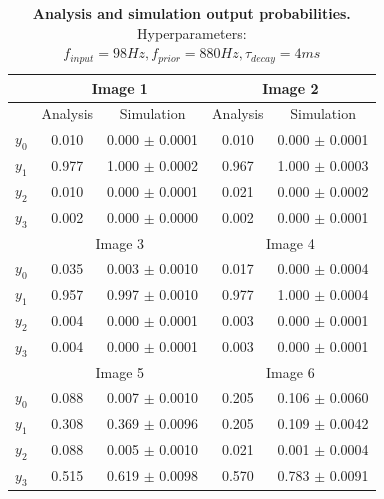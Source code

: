 \begin{table}[]
\centering
\label{tab:doubleSize_98_880_4}
\small
\tabcolsep=0.11cm
\begin{tabular}{|c|cc|cc|}
\hline
                       & \multicolumn{2}{c|}{Image 1}                       & \multicolumn{2}{c|}{Image 2}                       \\ \hline
                       & \multicolumn{1}{c|}{Analysis} & Simulation         & \multicolumn{1}{c|}{Analysis} & Simulation         \\ \hline
$y_0$                  & \multicolumn{1}{c|}{0.010}    & 0.000 $\pm$ 0.0001 & \multicolumn{1}{c|}{0.010}    & 0.000 $\pm$ 0.0001 \\ \hline
$y_1$                  & \multicolumn{1}{c|}{0.977}    & 1.000 $\pm$ 0.0002 & \multicolumn{1}{c|}{0.967}    & 1.000 $\pm$ 0.0003 \\ \hline
$y_2$                  & \multicolumn{1}{c|}{0.010}    & 0.000 $\pm$ 0.0001 & \multicolumn{1}{c|}{0.021}    & 0.000 $\pm$ 0.0002 \\ \hline
$y_3$                  & \multicolumn{1}{c|}{0.002}    & 0.000 $\pm$ 0.0000 & \multicolumn{1}{c|}{0.002}    & 0.000 $\pm$ 0.0001 \\ \hline
                       & \multicolumn{2}{c|}{Image 3}                       & \multicolumn{2}{c|}{Image 4}                       \\ \hline
$y_0$                  & \multicolumn{1}{c|}{0.035}    & 0.003 $\pm$ 0.0010 & \multicolumn{1}{c|}{0.017}    & 0.000 $\pm$ 0.0004 \\ \hline
$y_1$                  & \multicolumn{1}{c|}{0.957}    & 0.997 $\pm$ 0.0010 & \multicolumn{1}{c|}{0.977}    & 1.000 $\pm$ 0.0004 \\ \hline
$y_2$                  & \multicolumn{1}{c|}{0.004}    & 0.000 $\pm$ 0.0001 & \multicolumn{1}{c|}{0.003}    & 0.000 $\pm$ 0.0001 \\ \hline
$y_3$                  & \multicolumn{1}{c|}{0.004}    & 0.000 $\pm$ 0.0001 & \multicolumn{1}{c|}{0.003}    & 0.000 $\pm$ 0.0001 \\ \hline
						& \multicolumn{2}{c|}{Image 5}                       & \multicolumn{2}{c|}{Image 6}                       \\ \hline
$y_0$                  & \multicolumn{1}{c|}{0.088}    & 0.007 $\pm$ 0.0010 & \multicolumn{1}{c|}{0.205}    & 0.106 $\pm$ 0.0060 \\ \hline
$y_1$                  & \multicolumn{1}{c|}{0.308}    & 0.369 $\pm$ 0.0096 & \multicolumn{1}{c|}{0.205}    & 0.109 $\pm$ 0.0042 \\ \hline
$y_2$                  & \multicolumn{1}{c|}{0.088}    & 0.005 $\pm$ 0.0010 & \multicolumn{1}{c|}{0.021}    & 0.001 $\pm$ 0.0004 \\ \hline
$y_3$                  & \multicolumn{1}{c|}{0.515}    & 0.619 $\pm$ 0.0098 & \multicolumn{1}{c|}{0.570}    & 0.783 $\pm$ 0.0091 \\ \hline
\end{tabular}
\caption{\textbf{Analysis and simulation output probabilities. } Hyperparameters: $f_{input} = 98 Hz, f_{prior} = 880 Hz, \tau_{decay} = 4 ms$}
\end{table}

